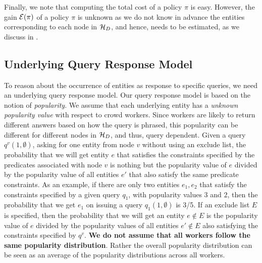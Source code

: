 Finally, we note that computing the total cost of a policy $\pi$ is easy. However, the gain $\mathcal{E}(\pi)$ of a policy $\pi$ is unknown as we do not know in advance the entities corresponding to each node in $\mathcal{H}_D$, and hence, needs to be estimated, as we discuss in . 

\subsection{Underlying Query Response Model}
\label{sec:sampling}
To reason about the occurrence of entities as response to specific queries, we need an underlying query response model. Our query response model is based on the notion of {\em popularity}.
\ifpaper We assume that each underlying entity has a {\em unknown popularity value} with respect to crowd workers. Since workers are likely to return different answers based on how the query is phrased, this popularity can be different for different nodes in $\mathcal{H}_D$, and thus, query dependent. 
Given a query $q^v(1, \emptyset)$, asking for one entity from node $v$ without using an exclude list, the probability that we will get entity $e$ that satisfies the constraints specified by the predicates associated with node $v$ is nothing but the popularity value of $e$ divided by the popularity value of all entities $e'$ that also satisfy the same predicate constraints. As an example, if there are only two entities $e_1, e_2$ that satisfy the constraints specified by a given query $q_1$, with popularity values $3$ and $2$, then the probability that we get $e_1$ on issuing a query $q_1(1, \emptyset)$ is 3/5. If an exclude list $E$ is specified, then the probability that we will get an entity $e \notin E$ is the popularity value of $e$ divided by the popularity values of all entities $e' \notin E$ also satisfying the constraints specified by $q^v$. {\bf We do not assume that all workers follow the same popularity distribution}. Rather the overall popularity distribution can be seen as an average of the popularity distributions across all workers.

